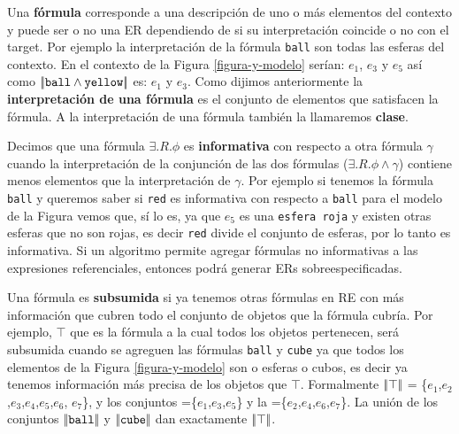 Una \textbf{f\'ormula} corresponde a una descripci\'on de uno o m\'as elementos del contexto y puede ser o no una ER dependiendo de 
si su interpretaci\'on coincide o no con el target. Por ejemplo la interpretaci\'on de la f\'ormula \texttt{ball} son todas las esferas 
del contexto. En el contexto de la Figura \ref{figura-y-modelo} ser\'ian: $e_1$, $e_3$ y $e_5$  as\'i como $|\!|\texttt{ball} \land \texttt{yellow}|\!|$ es: $e_1$ y $e_3$.
Como dijimos anteriormente la \textbf{interpretaci\'on de una f\'ormula} es el conjunto de elementos que satisfacen la f\'ormula. A la interpretaci\'on de una f\'ormula tambi\'en la llamaremos \textbf{clase}.

Decimos que una f\'ormula $\exists.R. \phi$ es \textbf{informativa} con respecto a otra f\'ormula $\gamma$ cuando la interpretaci\'on de la conjunci\'on de las dos f\'ormulas ($\exists.R. \phi \land \gamma$) contiene menos elementos que la interpretaci\'on de $\gamma$. Por ejemplo si tenemos la f\'ormula \texttt{ball} y 
queremos saber si \texttt{red} es informativa con respecto a \texttt{ball} para el modelo de la Figura vemos que, s\'i lo es, ya que $e_5$ es una \texttt{esfera roja} y existen otras esferas que no son rojas,
 es decir \texttt{red} divide el conjunto de esferas, por lo tanto es informativa. Si un algoritmo permite agregar f\'ormulas no informativas a las expresiones referenciales, entonces podr\'a generar ERs sobreespecificadas.

Una f\'ormula es \textbf{subsumida} si ya tenemos otras f\'ormulas en RE con m\'as informaci\'on que cubren todo el conjunto de objetos que 
la f\'ormula cubr\'ia. Por ejemplo, $\top$ que es la f\'ormula a la cual todos los objetos pertenecen, ser\'a subsumida cuando se agreguen 
las f\'ormulas \texttt{ball} y \texttt{cube} ya que todos los elementos de la Figura \ref{figura-y-modelo} son o esferas o cubos, 
es decir ya tenemos informaci\'on m\'as precisa de los objetos que $\top$. Formalmente $|\!|\top|\!|$ = \{$e_1$,$e_2$,$e_3$,$e_4$,$e_5$,$e_6$, $e_7$\}, y los conjuntos =\{$e_1$,$e_3$,$e_5$\} y la =\{$e_2$,$e_4$,$e_6$,$e_7$\}. La uni\'on de los conjuntos $|\!|\texttt{ball}|\!|$ y $|\!|\texttt{cube}|\!|$ dan exactamente $|\!|\top|\!|$.


